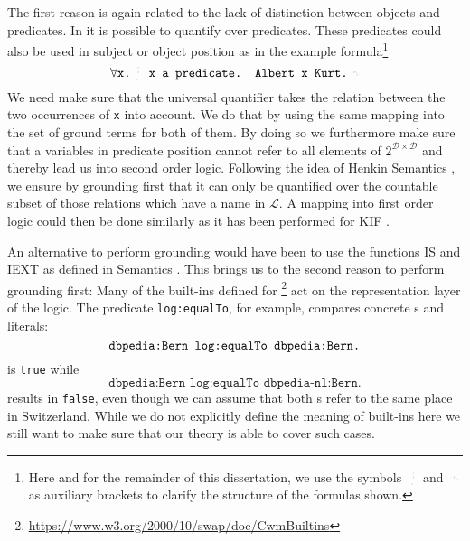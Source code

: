 The first reason is again related to the lack of distinction 
between objects and predicates. In \nthree it is possible to quantify over predicates. 
These predicates could also be used in subject or object position as in the example formula\footnote{Here and for the remainder of this dissertation, we use the symbols $\lhexbrace$ and $\rhexbrace$ as auxiliary brackets 
to clarify the structure of the formulas shown.}
\[
 \forall \texttt{x.}\lhexbrace\texttt{ x a predicate. Albert x Kurt.}\rhexbrace
\]
We need make sure that the universal quantifier takes the relation between the 
two occurrences of \texttt{x} into account. 
We do that by using the same mapping into the set of ground terms for both of them.
By doing so we furthermore make sure that a variables in predicate position cannot refer to all elements of $2^{\mathcal{D}\times\mathcal{D}}$ and thereby lead us into second order logic.
Following the idea of  Henkin Semantics \cite{henkin_1950}, we ensure by grounding first that it can only be quantified over 
the countable subset of those relations 
which have a name in $\mathcal{L}$. 
A mapping into first order logic could then be done similarly as it has been performed for KIF \cite{skif}. %

An alternative to perform grounding would have been to use the functions IS and IEXT as defined in \rdf Semantics \cite{RDFSemantics}. 
This brings us to the second reason to perform grounding first: %
%
Many of the built-ins defined 
for \nthreelogic\footnote{\url{https://www.w3.org/2000/10/swap/doc/CwmBuiltins}} 
act on the representation layer of the logic. The predicate \texttt{log:equalTo}, for example, 
compares concrete \uri{}s and literals:
\[
 \texttt{dbpedia:Bern log:equalTo \texttt{dbpedia:Bern}.} 
\]
is \texttt{true} while
\[
 \texttt{dbpedia:Bern log:equalTo dbpedia-nl:Bern.}
\]
results in \texttt{false}, even though we can assume that both \uri{}s refer to the same place in Switzerland.
While we do not explicitly define the meaning of built-ins here 
we still want to make sure that our theory is able to cover such cases.

